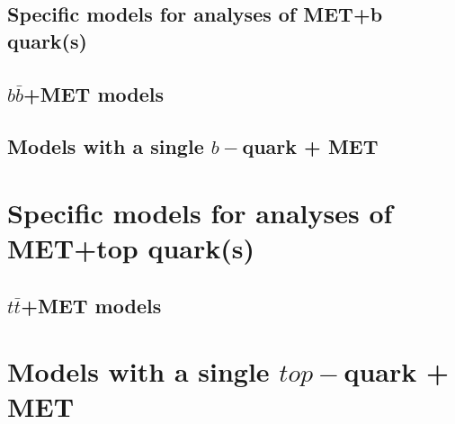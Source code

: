 \subsection{Specific models for analyses of MET+b quark(s)}

\subsection{$b \bar{b}$+MET models}



\subsection{Models with a single $b-$quark + MET}



\section{Specific models for analyses of MET+top quark(s)}

\subsection{$t \bar{t}$+MET models}



\section{Models with a single $top-$quark + MET}


